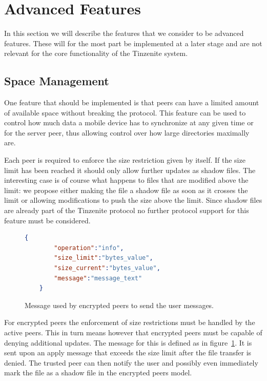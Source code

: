 \section{Advanced Features}
\label{sec:Advanced Features}

In this section we will describe the features that we consider to be advanced features.
These will for the most part be implemented at a later stage and are not relevant for the core functionality of the Tinzenite system.

\subsection{Space Management}
\label{sub:Space Management}

One feature that should be implemented is that peers can have a limited amount of available space without breaking the protocol.
This feature can be used to control how much data a mobile device has to synchronize at any given time or for the server peer, thus allowing control over how large directories maximally are.

Each peer is required to enforce the size restriction given by itself.
If the size limit has been reached it should only allow further updates as shadow files.
The interesting case is of course what happens to files that are modified above the limit: we propose either making the file a shadow file as soon as it crosses the limit or allowing modifications to push the size above the limit.
Since shadow files are already part of the Tinzenite protocol no further protocol support for this feature must be considered.

\begin{figure}[htp]
    \begin{lstlisting}[language=json,firstnumber=0]
    {
        "operation":"info",
        "size_limit":"bytes_value",
        "size_current":"bytes_value",
        "message":"message_text"
    }
    \end{lstlisting}
\caption[Information Message]{Message used by encrypted peers to send the user messages.}
\label{json:info_message}
\end{figure}

For encrypted peers the enforcement of size restrictions must be handled by the active peers.
This in turn means however that encrypted peers must be capable of denying additional updates.
The message for this is defined as in figure~\ref{json:info_message}.
It is sent upon an apply message that exceeds the size limit after the file transfer is denied.
The trusted peer can then notify the user and possibly even immediately mark the file as a shadow file in the encrypted peers model.

